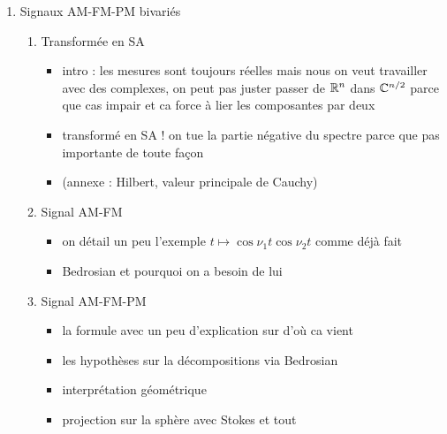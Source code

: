 \begin{enumerate}[label=\arabic* --- ]\bfseries
	
	\item Signaux AM-FM-PM bivariés
	\begin{enumerate}[label=\arabic{enumi}.\arabic* --- ]
		
		\item Transformée en SA
		\begin{itemize} \normalfont
			\item intro : les mesures sont toujours réelles mais nous on veut travailler avec des complexes, on peut pas juster passer de $\mathbb{R}^n$ dans $\mathbb{C}^{n/2}$ parce que cas impair et ca force à lier les composantes par deux
			
			\item transformé en SA ! on tue la partie négative du spectre parce que pas importante de toute façon
			
			\item (annexe : Hilbert, valeur principale de Cauchy)
		\end{itemize}
		
		\item Signal AM-FM
		\begin{itemize} \normalfont
			
			\item on détail un peu l'exemple $t \longmapsto \cos\nu_1t\cos\nu_2t$ comme déjà fait
			
			\item Bedrosian et pourquoi on a besoin de lui
			
		\end{itemize}
		
		\item Signal AM-FM-PM
		\begin{itemize} \normalfont
			
			\item la formule avec un peu d'explication sur d'où ca vient
			
			\item les hypothèses sur la décompositions via Bedrosian
			
			\item interprétation géométrique
			
			\item projection sur la sphère avec Stokes et tout
			
		\end{itemize}
	\end{enumerate}
	

\end{enumerate}
